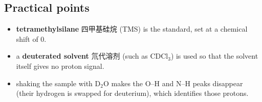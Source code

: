 \documentclass[11pt]{article}
\begin{document}
\subsection*{Practical points}

\begin{itemize}
\item \textbf{tetramethylsilane} 四甲基硅烷 (TMS) is the standard, set at a chemical shift of $0$.

\item a \textbf{deuterated solvent} 氘代溶剂 (such as $\text{CDCl}_3$) is used so that the solvent itself gives no proton signal.

\item shaking the sample with $\text{D}_2\text{O}$ makes the O–H and N–H peaks disappear (their hydrogen is swapped for deuterium), which identifies those protons.

\end{itemize}
\end{document}

